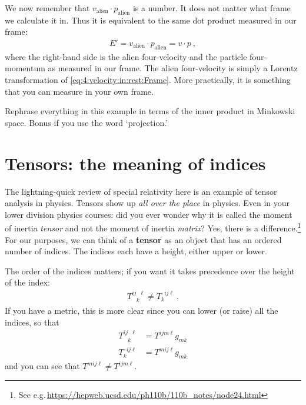 \documentclass[12pt, oneside]{report}    %
\let\oldsection\section
\def\section{%
  \setcounter{sidenote}{1}%
  \oldsection
}
\begin{document}
We now remember that $v_\text{alien}\cdot p_\text{alien}$ is a number. It does not matter what frame we calculate it in. Thus it is equivalent to the same dot product measured in our frame:
\begin{align}
E'=
    v_\text{alien}\cdot p_\text{alien} = v\cdot p \ ,
\end{align}
where the right-hand side is the alien four-velocity and the particle four-momentum as measured in our frame. The alien four-velocity is simply a Lorentz transformation of \eqref{eq:4:velocity:in:rest:Frame}. More practically, it is something that you can measure in your own frame. 


\begin{exercise}
Rephrase everything in this example in terms of the inner product in Minkowski space. Bonus if you use the word `projection.'
\end{exercise}






\section{Tensors: the meaning of indices}


The lightning-quick review of special relativity here is an example of tensor analysis in physics. Tensors show up \emph{all over the place} in physics. Even in your lower division physics courses: did you ever wonder why it is called the moment of inertia \emph{tensor} and not the moment of inertia \emph{matrix}? Yes, there is a difference.\footnote{See e.g.\,\url{https://hepweb.ucsd.edu/ph110b/110b_notes/node24.html}} For our purposes, we can think of a \textbf{tensor} as an object that has an ordered number of indices. The indices each have a height, either upper or lower. 

The order of the indices matters; if you want it takes precedence over the height of the index: 
\begin{align}
    T^{ij\phantom{k}\ell}_{\phantom{ij}k} \neq
    T^{\phantom{k}ij\ell}_{k} \ .
\end{align}
If you have a metric, this is more clear since you can lower (or raise) all the indices, so that 
\begin{align}
    T^{ij\phantom{k}\ell}_{\phantom{ij}k} &= T^{ijm\ell}g_{mk}
    \\
    T^{\phantom{k}ij\ell}_{k}&=T^{mij\ell} g_{mk}
\end{align}
and you can see that $T^{mij\ell} \neq T^{ijm\ell}$.
\end{document}
